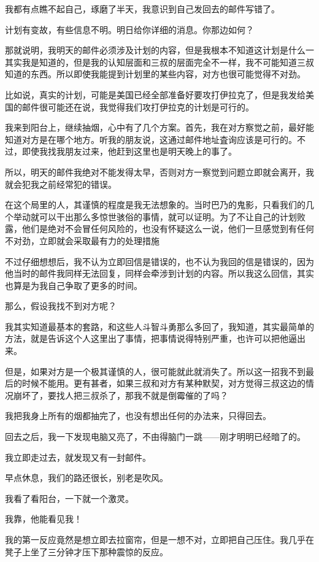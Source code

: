 我都有点瞧不起自己，琢磨了半天，我意识到自己发回去的邮件写错了。

计划有变故，有些信息不明。明日给你详细的消息。你那边如何？

那就说明，我明天的邮件必须涉及计划的内容，但是我根本不知道这计划是什么一其实我是知道的，但是我的认知层面和三叔的层面完全不一样，我不可能知道三叔知道的东西。所以即使我能提到计划里的某些内容，对方也很可能觉得不对劲。

比如说，真实的计划，可能是美国已经全部准备好要攻打伊拉克了，但是我发给美国的邮件很可能还在说，我觉得我们攻打伊拉克的计划是可行的。

我来到阳台上，继续抽烟，心中有了几个方案。首先，我在对方察觉之前，最好能知道对方是在哪个地方。听我的朋友说，这通过邮件地址査询应该是可行的。不过，即使我找我朋友过来，他赶到这里也是明天晚上的事了。

所以，明天的邮件我绝对不能发得太早，否则对方一察觉到问题立即就会离开，我就会犯我之前经常犯的错误。

在这个局里的人，其谨慎的程度是我无法想象的。当时巴乃的鬼影，只看我们的几个举动就可以干出那么多惊世骇俗的事情，就可以证明。为了不让自己的计划败露，他们是绝对不会冒任何风险的，也没有怀疑这么一说，他们一旦感觉到有任何不对劲，立即就会采取最有力的处理措施

不过仔细想想后，我不认为立即回信是错误的，也不认为我回的信是错误的，因为他当时的邮件我同样无法回复，同样会牵涉到计划的内容。所以我这么回信，其实也算是为我自己争取了更多的时间。

那么，假设我找不到对方呢？

我其实知道最基本的套路，和这些人斗智斗勇那么多回了，我知道，其实最简单的方法，就是告诉这个人这里出了事情，把事情说得特别严重，也许可以把他逼出来。

但是，如果对方是一个极其谨慎的人，很可能就此就消失了。所以这一招我不到最后的时候不能用。更有甚者，如果三叔和对方有某种默契，对方觉得三叔这边的情况崩坏了，要找人把三叔杀了，那我不就是倒霉催的了吗？

我把我身上所有的烟都抽完了，也没有想出任何的办法来，只得回去。

回去之后，我一下发现电脑又亮了，不由得脑门一跳——刚才明明已经暗了的。

我立即走过去，就发现又有一封邮件。

早点休息，我们的路还很长，别老是吹风。

我看了看阳台，一下就一个激灵。

我靠，他能看见我！

我的第一反应竟然是想立即去拉窗帘，但是一想不对，立即把自己压住。我几乎在凳子上坐了三分钟才压下那种震惊的反应。

